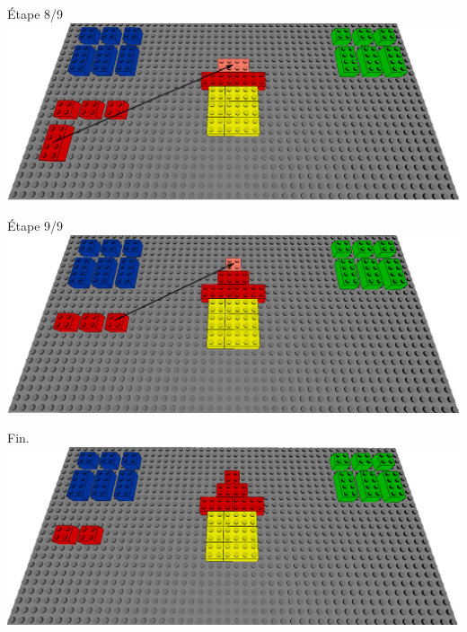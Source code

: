 \documentclass[aspectratio=169]{beamer}
\begin{document}
\begin{frame}
    Étape 8/9
    \vfill
  \includegraphics[width=\linewidth]{step8.png}
\end{frame}

\begin{frame}
    Étape 9/9
    \vfill
  \includegraphics[width=\linewidth]{step9.png}
\end{frame}

\begin{frame}
    Fin.
    \vfill
  \includegraphics[width=\linewidth]{end.png}
\end{frame}
\end{document}
